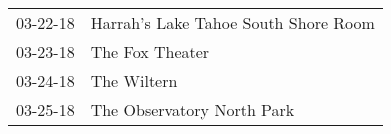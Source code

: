 \begin{supertabular}{p{0.07\textwidth}p{0.23\textwidth}}
 03-22-18 &  Harrah’s Lake Tahoe South Shore Room \\
 03-23-18 &                       The Fox Theater \\
 03-24-18 &                           The Wiltern \\
 03-25-18 &            The Observatory North Park \\
\end{supertabular}
